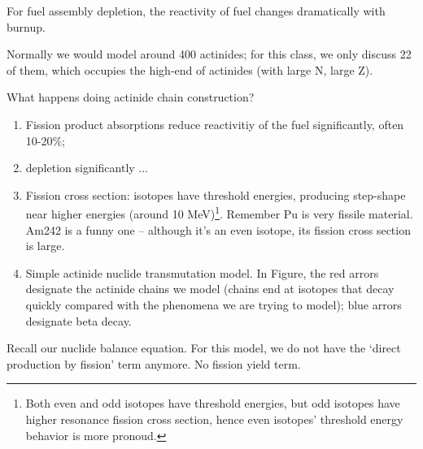\documentclass{school-22.211-notes}
\date{April 11, 2012}
\begin{document}
\maketitle

For fuel assembly depletion, the reactivity of fuel changes dramatically with burnup. 

Normally we would model around 400 actinides; for this class, we only discuss 22 of them, which occupies the high-end of actinides (with large N, large Z). 

What happens doing actinide chain construction? 
\begin{enumerate}
\item Fission product absorptions reduce reactivitiy of the fuel significantly, often 10-20\%;
\item {} depletion significantly ...

\item Fission cross section: isotopes have threshold energies, producing step-shape near higher energies (around 10 MeV)\footnote{Both even and odd isotopes have threshold energies, but odd isotopes have higher resonance fission cross section, hence even isotopes' threshold energy behavior is more pronoud.}. Remember Pu is very fissile material. Am242 is a funny one -- although it's an even isotope, its fission cross section is large. 

\item Simple actinide nuclide transmutation model. In Figure, the red arrors designate the actinide chains we model (chains end at isotopes that decay quickly compared with the phenomena we are trying to model); blue arrors designate beta decay. 
\end{enumerate}



\clearpage
{}
Recall our nuclide balance equation. For this model, we do not have the `direct production by fission' term anymore.  No fission yield term. 
\end{document}
